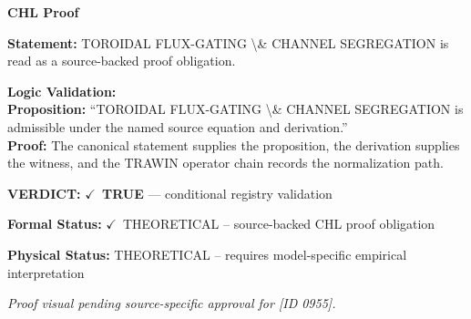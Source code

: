 \vspace{0.45em}
\noindent\textbf{CHL Proof}\par
\textbf{Statement:} TOROIDAL FLUX-GATING \textbackslash{}\& CHANNEL SEGREGATION is read as a source-backed proof obligation.

\textbf{Logic Validation:}\\
\textbf{Proposition:} ``TOROIDAL FLUX-GATING \textbackslash{}\& CHANNEL SEGREGATION is admissible under the named source equation and derivation.''\\
\textbf{Proof:} The canonical statement supplies the proposition, the derivation supplies the witness, and the TRAWIN operator chain records the normalization path.

\textbf{VERDICT:} \ensuremath{\checkmark}\ \textbf{TRUE} --- conditional registry validation

\textbf{Formal Status:} \ensuremath{\checkmark}\ THEORETICAL -- source-backed CHL proof obligation

\textbf{Physical Status:} THEORETICAL -- requires model-specific empirical interpretation
\par\vspace{0.45em}
\par
\vfill
\begingroup\footnotesize\itshape
Proof visual pending source-specific approval for [ID 0955].
\par\endgroup
\vfill
\endgroup
\endgroup
